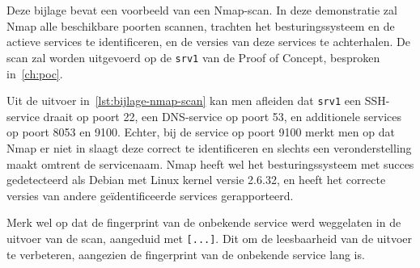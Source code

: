 
\chapter{}%
\label{ch:bijlage_nmap}

Deze bijlage bevat een voorbeeld van een Nmap-scan.
In deze demonstratie zal Nmap alle beschikbare poorten scannen, trachten het besturingssysteem en de actieve services te identificeren, en de versies van deze services te achterhalen.
De scan zal worden uitgevoerd op de \texttt{srv1} van de Proof of Concept, besproken in~\ref{ch:poc}.

Uit de uitvoer in~\ref{lst:bijlage-nmap-scan} kan men afleiden dat \texttt{srv1} een SSH-service draait op poort 22, een DNS-service op poort 53, en additionele services op poort 8053 en 9100.
Echter, bij de service op poort 9100 merkt men op dat Nmap er niet in slaagt deze correct te identificeren en slechts een veronderstelling maakt omtrent de servicenaam.
Nmap heeft wel het besturingssysteem met succes gedetecteerd als Debian met Linux kernel versie 2.6.32, en heeft het correcte versies van andere ge\"identificeerde services gerapporteerd.

Merk wel op dat de fingerprint van de onbekende service werd weggelaten in de uitvoer van de scan, aangeduid met \texttt{[...]}.
Dit om de leesbaarheid van de uitvoer te verbeteren, aangezien de fingerprint van de onbekende service lang is.

